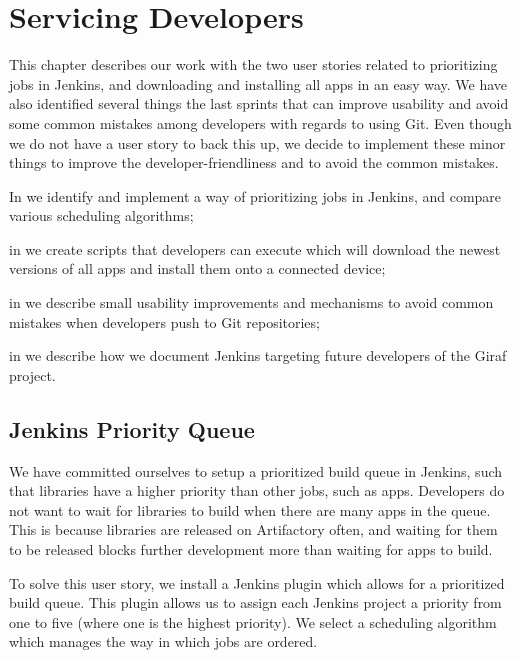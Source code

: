 \chapter{Servicing Developers}
This chapter describes our work with the two user stories related to prioritizing jobs in Jenkins, and downloading and installing all apps in an easy way. We have also identified several things the last sprints that can improve usability and avoid some common mistakes among developers with regards to using Git. Even though we do not have a user story to back this up, we decide to implement these minor things to improve the developer-friendliness and to avoid the common mistakes.

\begin{chapterorganization}
  \item In  we identify and implement a way of prioritizing jobs in Jenkins, and compare various scheduling algorithms;
  \item in  we create scripts that developers can execute which will download the newest versions of all apps and install them onto a connected device;
  \item in  we describe small usability improvements and mechanisms to avoid common mistakes when developers push to Git repositories;
  \item in  we describe how we document Jenkins targeting future developers of the Giraf project.
\end{chapterorganization}

\section{Jenkins Priority Queue}\label{sec:jenkins_prio_queue}
We have committed ourselves to setup a prioritized build queue in Jenkins, such that libraries have a higher priority than other jobs, such as apps. Developers do not want to wait for libraries to build when there are many apps in the queue. This is because libraries are released on Artifactory often, and waiting for them to be released blocks further development more than waiting for apps to build.

To solve this user story, we install a Jenkins plugin \parencite{jenkins-priority-plugin} which allows for a prioritized build queue. This plugin allows us to assign each Jenkins project a priority from one to five (where one is the highest priority). We select a scheduling algorithm which manages the way in which jobs are ordered.

